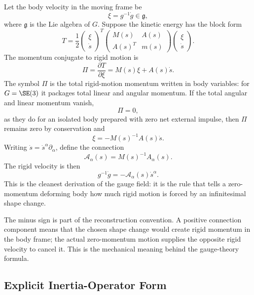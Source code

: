 Let the body velocity in the moving frame be
\[
  \xi=g^{-1}\dot g\in\mathfrak g,
\]
where \(\mathfrak g\) is the Lie algebra of \(G\). Suppose the kinetic energy
has the block form
\[
  T
  =
  \frac12
  \begin{pmatrix}
  \xi\\ \dot s
  \end{pmatrix}^T
  \begin{pmatrix}
  M(s) & A(s)\\
  A(s)^T & m(s)
  \end{pmatrix}
  \begin{pmatrix}
  \xi\\ \dot s
  \end{pmatrix}.
\]
The momentum conjugate to rigid motion is
\[
  \Pi=\frac{\partial T}{\partial \xi}=M(s)\xi+A(s)\dot s.
\]
The symbol \(\Pi\) is the total rigid-motion momentum written in body
variables: for \(G=\SE(3)\) it packages total linear and angular momentum.
If the total angular and linear momentum vanish,
\[
  \Pi=0,
\]
as they do for an isolated body prepared with zero net external impulse, then
\(\Pi\) remains zero by conservation and
\[
  \xi=-M(s)^{-1}A(s)\dot s.
\]
Writing \(\dot s=\dot s^\alpha\partial_\alpha\), define the connection
\[
  \boxed{
  \mathcal A_\alpha(s)=M(s)^{-1}A_\alpha(s).
  }
\]
The rigid velocity is then
\[
  \boxed{
  g^{-1}\dot g=-\mathcal A_\alpha(s)\dot s^\alpha.
  }
\]
This is the cleanest derivation of the gauge field: it is the rule that tells a
zero-momentum deforming body how much rigid motion is forced by an infinitesimal
shape change.

The minus sign is part of the reconstruction convention. A positive connection
component means that the chosen shape change would create rigid momentum in the
body frame; the actual zero-momentum motion supplies the opposite rigid
velocity to cancel it. This is the mechanical meaning behind the gauge-theory
formula.

\subsection{Explicit Inertia-Operator Form}
\label{subsec:explicit-gauge-equation}

